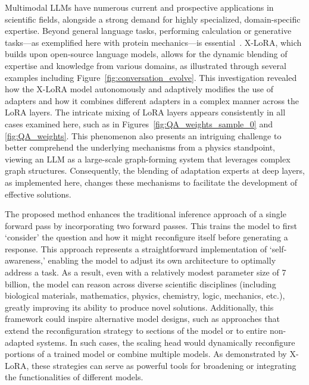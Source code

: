 Multimodal LLMs have numerous current and prospective applications in scientific fields, alongside a strong demand for highly specialized, domain-specific expertise. Beyond general language tasks, performing calculation or generative tasks—as exemplified here with protein mechanics—is essential~\cite{Luu2023BioinspiredLLM:Materials,Buehler2023MechGPTModalities,Buehler2023MeLMProblemsb}. X-LoRA, which builds upon open-source language models, allows for the dynamic blending of expertise and knowledge from various domains, as illustrated through several examples including Figure~\ref{fig:conversation_evolve}. This investigation revealed how the X-LoRA model autonomously and adaptively modifies the use of adapters and how it combines different adapters in a complex manner across the LoRA layers. The intricate mixing of LoRA layers appears consistently in all cases examined here, such as in Figures~\ref{fig:QA_weights_sample_0} and \ref{fig:QA_weights}. This phenomenon also presents an intriguing challenge to better comprehend the underlying mechanisms from a physics standpoint, viewing an LLM as a large-scale graph-forming system that leverages complex graph structures. Consequently, the blending of adaptation experts at deep layers, as implemented here, changes these mechanisms to facilitate the development of effective solutions.

The proposed method enhances the traditional inference approach of a single forward pass by incorporating two forward passes. This trains the model to first ‘consider’ the question and how it might reconfigure itself before generating a response. This approach represents a straightforward implementation of ‘self-awareness,’ enabling the model to adjust its own architecture to optimally address a task. As a result, even with a relatively modest parameter size of 7 billion, the model can reason across diverse scientific disciplines (including biological materials, mathematics, physics, chemistry, logic, mechanics, etc.), greatly improving its ability to produce novel solutions. Additionally, this framework could inspire alternative model designs, such as approaches that extend the reconfiguration strategy to sections of the model or to entire non-adapted systems. In such cases, the scaling head would dynamically reconfigure portions of a trained model or combine multiple models. As demonstrated by X-LoRA, these strategies can serve as powerful tools for broadening or integrating the functionalities of different models.


